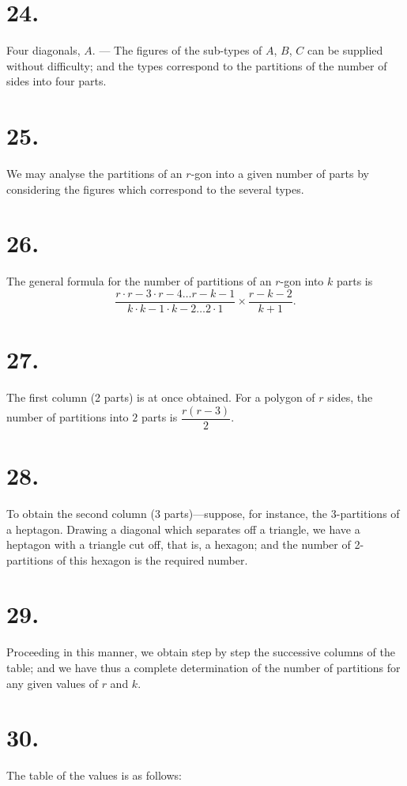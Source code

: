 \documentclass[11pt,a4paper]{article}
\begin{document}
\section*{24.}
Four diagonals, $A$. --- The figures of the sub-types of $A$, $B$, $C$ can be supplied without difficulty; and the types correspond to the partitions of the number of sides into four parts.

\section*{25.}
We may analyse the partitions of an $r$-gon into a given number of parts by considering the figures which correspond to the several types.

\section*{26.}
The general formula for the number of partitions of an $r$-gon into $k$ parts is
\[
\frac{r \cdot r - 3 \cdot r - 4 \ldots r - k - 1}{k \cdot k - 1 \cdot k - 2 \ldots 2 \cdot 1} \times \frac{r - k - 2}{k + 1}.
\]

\section*{27.}
The first column (2 parts) is at once obtained. For a polygon of $r$ sides, the number of partitions into $2$ parts is $\dfrac{r(r - 3)}{2}$.

\section*{28.}
To obtain the second column (3 parts)---suppose, for instance, the 3-partitions of a heptagon. Drawing a diagonal which separates off a triangle, we have a heptagon with a triangle cut off, that is, a hexagon; and the number of 2-partitions of this hexagon is the required number.

\section*{29.}
Proceeding in this manner, we obtain step by step the successive columns of the table; and we have thus a complete determination of the number of partitions for any given values of $r$ and $k$.

\section*{30.}
The table of the values is as follows:
\end{document}
